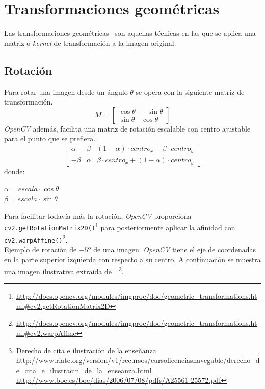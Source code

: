 \section{Transformaciones geométricas}
Las transformaciones geométricas~\emph{\citep*[Stretch, Shrink, Warp,
  and Rotate]{opencv_book-bib}} son aquellas técnicas en las que se
aplica una matriz o \emph{kernel} de transformación a la imagen
original.
\subsection{Rotación}
Para rotar una imagen desde un ángulo $\theta$ se opera con la siguiente
matriz de transformación.
\begin{equation*}
  M =
  \begin{bmatrix}
    \cos \theta & -\sin \theta \\ \sin \theta & \cos \theta
  \end{bmatrix}
\end{equation*}
\emph{OpenCV} además, facilita una matriz de rotación escalable con
centro ajustable para el punto que se prefiera.
\begin{equation*}
  \begin{bmatrix}
    \alpha & \beta & (1 - \alpha) \cdot centro_x - \beta \cdot centro_y \\
    - \beta & \alpha & \beta \cdot centro_x + (1 - \alpha) \cdot centro_y
  \end{bmatrix}
\end{equation*}
donde:
\begin{center}
  $ \alpha = escala \cdot \cos \theta $
  \\
  $ \beta = escala \cdot \sin \theta $
\end{center}
Para facilitar todavía más la rotación, \emph{OpenCV} proporciona
\texttt{cv2.getRotationMatrix2D()}\footnote{\url{http://docs.opencv.org/modules/imgproc/doc/geometric\_transformations.html\#cv2.getRotationMatrix2D}}
para posteriormente aplicar la afinidad con
\texttt{cv2.warpAffine()}\footnote{\url{http://docs.opencv.org/modules/imgproc/doc/geometric\_transformations.html\#cv2.warpAffine}}.\\

Ejemplo de rotación de $-5º$ de una imagen. \emph{OpenCV} tiene el eje
de coordenadas en la parte superior izquierda con respecto a su
centro. A continuación se muestra una imagen ilustrativa extraída
de~\citep*{opencv_tutorial-bib}~\footnote{Derecho de
  cita e ilustración de la enseñanza\\
  \url{http://www.riate.org/version/v1/recursos/cursolicenciasnavegable/derecho_de_cita_e_ilustracin_de_la_enseanza.html}\\
  \url{http://www.boe.es/boe/dias/2006/07/08/pdfs/A25561-25572.pdf}}.


